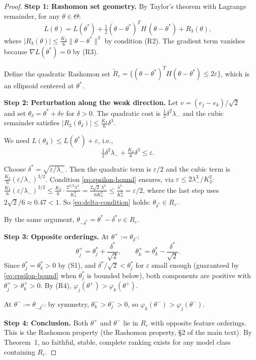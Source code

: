 \documentclass{article}
\begin{document}
\begin{proof}
\textbf{Step 1: Rashomon set geometry.}
By Taylor's theorem with Lagrange remainder, for any
$\theta \in \Theta$:
\begin{equation}
\label{eq:taylor}
    L(\theta) = L(\theta^*) + \tfrac{1}{2}(\theta - \theta^*)^T
    H\, (\theta - \theta^*) + R_3(\theta),
\end{equation}
where $|R_3(\theta)| \leq \frac{K_3}{6}\|\theta - \theta^*\|^3$
by condition (R2). The gradient term vanishes because
$\nabla L(\theta^*) = 0$ by (R3).

Define the quadratic Rashomon set
$\tilde{R}_\varepsilon = \{(\theta-\theta^*)^T H (\theta-\theta^*) \leq 2\varepsilon\}$, which is an ellipsoid centered at $\theta^*$.

\textbf{Step 2: Perturbation along the weak direction.}
Let $v = (e_j - e_k)/\sqrt{2}$ and set
$\theta_\delta = \theta^* + \delta v$ for $\delta > 0$.
The quadratic cost is $\tfrac{1}{2}\delta^2 \lambda_-$ and the
cubic remainder satisfies $|R_3(\theta_\delta)| \leq
\frac{K_3}{6}\delta^3$.

We need $L(\theta_\delta) \leq L(\theta^*) + \varepsilon$, i.e.,
\begin{equation}
\label{eq:delta-condition}
    \tfrac{1}{2}\delta^2 \lambda_- + \tfrac{K_3}{6}\delta^3
    \leq \varepsilon.
\end{equation}

Choose $\delta^* = \sqrt{\varepsilon / \lambda_-}$.
Then the quadratic term is $\varepsilon/2$ and the cubic term is
$\frac{K_3}{6}(\varepsilon/\lambda_-)^{3/2}$.
Condition \eqref{eq:epsilon-bound} ensures, via $\varepsilon \leq 2\lambda_-^3/K_3^2$:
$\frac{K_3}{6}(\varepsilon/\lambda_-)^{3/2}
\leq \frac{K_3}{6} \cdot \frac{2^{3/2}\lambda_-^3}{K_3^3}
= \frac{2\sqrt{2}\,\lambda_-^3}{6K_3^2}
\leq \frac{\lambda_-^3}{K_3^2} = \varepsilon/2$,
where the last step uses $2\sqrt{2}/6 \approx 0.47 < 1$.
So \eqref{eq:delta-condition} holds:
$\theta_{\delta^*} \in R_\varepsilon$.

By the same argument, $\theta_{-\delta^*} = \theta^* - \delta^* v
\in R_\varepsilon$.

\textbf{Step 3: Opposite orderings.}
At $\theta^+ := \theta_{\delta^*}$:
\[
    \theta^+_j = \theta^*_j + \frac{\delta^*}{\sqrt{2}},
    \qquad
    \theta^+_k = \theta^*_k - \frac{\delta^*}{\sqrt{2}}.
\]
Since $\theta^*_j = \theta^*_k > 0$ by (S1), and
$\delta^*/\sqrt{2} < \theta^*_j$ for $\varepsilon$ small enough
(guaranteed by \eqref{eq:epsilon-bound} when $\theta^*_j$ is
bounded below), both components are positive with
$\theta^+_j > \theta^+_k > 0$.
By (R4), $\varphi_j(\theta^+) > \varphi_k(\theta^+)$.

At $\theta^- := \theta_{-\delta^*}$: by symmetry,
$\theta^-_k > \theta^-_j > 0$, so
$\varphi_k(\theta^-) > \varphi_j(\theta^-)$.

\textbf{Step 4: Conclusion.}
Both $\theta^+$ and $\theta^-$ lie in $R_\varepsilon$ with
opposite feature orderings. This is the Rashomon property
(the Rashomon property, \S2 of the main text). By Theorem~1,
no faithful, stable, complete ranking exists for any model
class containing $R_\varepsilon$.
\end{proof}
\end{document}
